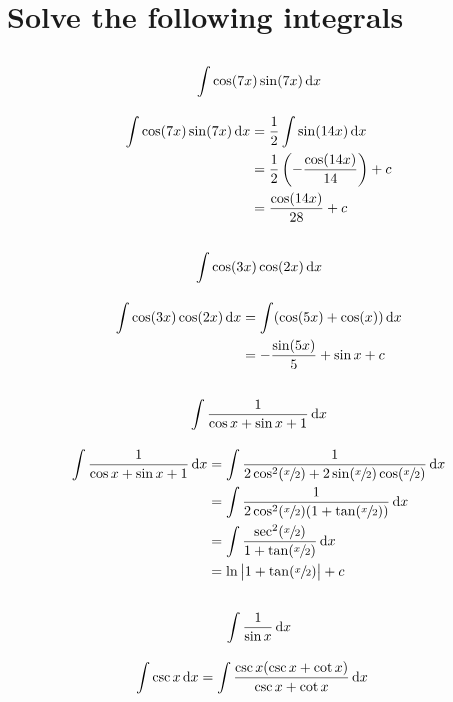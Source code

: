 \documentclass[fleqn, a4paper]{article}
\begin{document}
\section{Solve the following integrals}

\subsection{\[\int \cos(7x) \sin(7x) \dif x\]}

\begin{align*}
	\int \cos(7x) \sin(7x) \dif x &= \dfrac{1}{2} \int \sin(14x) \dif x\\
	&= \dfrac{1}{2} \left( -\dfrac{\cos (14x)}{14} \right) + c\\
	&= \dfrac{\cos (14x)}{28} + c
\end{align*}

\subsection{\[\int \cos(3x) \cos(2x) \dif x\]}

\begin{align*}
	\int \cos(3x) \cos(2x) \dif x &= \int (\cos(5x) + \cos(x)) \dif x\\
	&= -\dfrac{\sin(5x)}{5} + \sin x + c
\end{align*}

\subsection{\[\int \dfrac{1}{\cos x + \sin x + 1} \dif x\]}

\begin{align*}
	\int \dfrac{1}{\cos x + \sin x + 1} \dif x &= \int \dfrac{1}{2 \cos^2 (\sfrac{x}{2}) + 2 \sin (\sfrac{x}{2}) \cos (\sfrac{x}{2})} \dif x\\
	&= \int \dfrac{1}{2 \cos^2 (\sfrac{x}{2}) (1 + \tan (\sfrac{x}{2}))} \dif x\\
	&= \int \dfrac{\sec^2 (\sfrac{x}{2})}{1 + \tan (\sfrac{x}{2})} \dif x\\
	&= \ln \left\lvert 1 + \tan (\sfrac{x}{2}) \right\rvert + c
\end{align*}

\subsection{\[\int \dfrac{1}{\sin x} \dif x\]}

\begin{align*}
	\int \csc x \dif x &= \int \dfrac{\csc x (\csc x + \cot x)}{\csc x + \cot x} \dif x
\end{align*}
\end{document}
